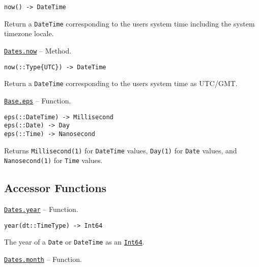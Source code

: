 \begin{adjustwidth}{2em}{0pt}


\begin{verbatim}
now() -> DateTime
\end{verbatim}

Return a \texttt{DateTime} corresponding to the user{\textquotesingle}s system time including the system timezone locale.



\end{adjustwidth}
\hypertarget{14867142023322691223}{} 
\hyperlink{14867142023322691223}{\texttt{Dates.now}}  -- {Method.}

\begin{adjustwidth}{2em}{0pt}


\begin{verbatim}
now(::Type{UTC}) -> DateTime
\end{verbatim}

Return a \texttt{DateTime} corresponding to the user{\textquotesingle}s system time as UTC/GMT.



\end{adjustwidth}
\hypertarget{4594213520310841636}{} 
\hyperlink{4594213520310841636}{\texttt{Base.eps}}  -- {Function.}

\begin{adjustwidth}{2em}{0pt}


\begin{verbatim}
eps(::DateTime) -> Millisecond
eps(::Date) -> Day
eps(::Time) -> Nanosecond
\end{verbatim}

Returns \texttt{Millisecond(1)} for \texttt{DateTime} values, \texttt{Day(1)} for \texttt{Date} values, and \texttt{Nanosecond(1)} for \texttt{Time} values.



\end{adjustwidth}

\hypertarget{1191060472934000044}{}


\subsection{Accessor Functions}


\hypertarget{9714527822092754339}{} 
\hyperlink{9714527822092754339}{\texttt{Dates.year}}  -- {Function.}

\begin{adjustwidth}{2em}{0pt}


\begin{verbatim}
year(dt::TimeType) -> Int64
\end{verbatim}

The year of a \texttt{Date} or \texttt{DateTime} as an \hyperlink{7720564657383125058}{\texttt{Int64}}.



\end{adjustwidth}
\hypertarget{3646624885120036576}{} 
\hyperlink{3646624885120036576}{\texttt{Dates.month}}  -- {Function.}

